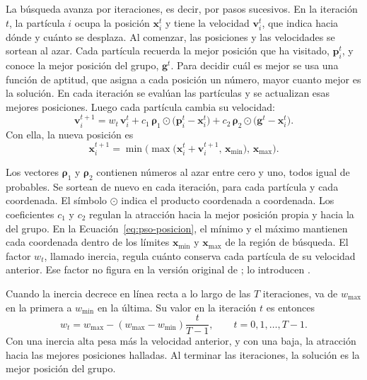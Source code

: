 La búsqueda avanza por iteraciones, es decir, por pasos sucesivos. En la iteración $t$, la partícula
$i$ ocupa la posición $\mathbf{x}_i^{t}$ y tiene la velocidad $\mathbf{v}_i^{t}$, que indica hacia
dónde y cuánto se desplaza. Al comenzar, las posiciones y las
velocidades se sortean al azar. Cada partícula recuerda la mejor posición que ha visitado,
$\mathbf{p}_i^{t}$, y conoce la mejor posición del grupo, $\mathbf{g}^{t}$. Para decidir cuál es mejor
se usa una función de aptitud, que asigna a cada posición un número, mayor cuanto mejor es la solución.
En cada iteración se evalúan las partículas y se actualizan esas mejores posiciones. Luego cada partícula
cambia su velocidad:
\begin{equation} \mathbf{v}_i^{t+1} = w_t\,\mathbf{v}_i^{t} + c_1\,\boldsymbol{\rho}_1 \odot \bigl(\mathbf{p}_i^{t} - \mathbf{x}_i^{t}\bigr) + c_2\,\boldsymbol{\rho}_2 \odot \bigl(\mathbf{g}^{t} - \mathbf{x}_i^{t}\bigr). \label{eq:pso-velocidad} \end{equation}
Con ella, la nueva posición es
\begin{equation} \mathbf{x}_i^{t+1} = \min\bigl(\max\bigl(\mathbf{x}_i^{t} + \mathbf{v}_i^{t+1},\, \mathbf{x}_{\min}\bigr),\, \mathbf{x}_{\max}\bigr). \label{eq:pso-posicion} \end{equation}

Los vectores $\boldsymbol{\rho}_1$ y $\boldsymbol{\rho}_2$ contienen números al azar entre cero y uno,
todos igual de probables. Se sortean de nuevo en cada iteración, para cada partícula y cada coordenada.
El símbolo $\odot$ indica el producto coordenada a coordenada. Los coeficientes $c_1$ y $c_2$ regulan
la atracción hacia la mejor posición propia y hacia la del grupo. En la
Ecuación~\eqref{eq:pso-posicion}, el mínimo y el máximo mantienen cada coordenada dentro de los límites
$\mathbf{x}_{\min}$ y $\mathbf{x}_{\max}$ de la región de búsqueda. El factor $w_t$, llamado inercia,
regula cuánto conserva cada partícula de su velocidad anterior. Ese factor no figura en la versión
original de \textcite{kennedy1995}; lo introducen \textcite{shi1998}.

Cuando la inercia decrece en línea recta a lo largo de las $T$ iteraciones, va de $w_{\max}$ en la
primera a $w_{\min}$ en la última. Su valor en la iteración $t$ es entonces
\begin{equation} w_t = w_{\max} - \left(w_{\max} - w_{\min}\right)\frac{t}{T-1}, \qquad t = 0, 1, \ldots, T-1. \label{eq:pso-inercia} \end{equation}
Con una inercia alta pesa más la velocidad anterior, y con una baja, la atracción hacia las mejores
posiciones halladas. Al terminar las iteraciones, la solución es la mejor posición del grupo.

